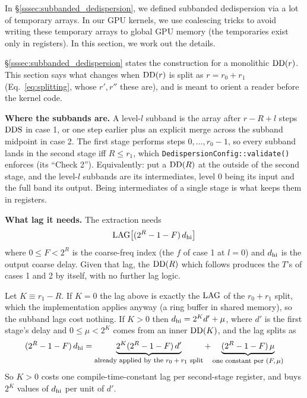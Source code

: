 \documentclass{article}
\numberwithin{equation}{section}   %
\def\DDS{{\rm DDS}}
\def\DD{{\rm DD}}
\def\LAG{{\rm LAG}}
\begin{document}
In \S\ref{sssec:subbanded_dedispersion}, we defined subbanded dedispersion via
a lot of temporary arrays.
In our GPU kernels, we use coalescing tricks to avoid
writing these temporary arrays to global GPU memory (the temporaries exist only in registers).
In this section, we work out the details.

\S\ref{sssec:subbanded_dedispersion} states the construction for a monolithic $\DD(r)$. This
section says what changes when $\DD(r)$ is split as $r = r_0+r_1$ (Eq.\ \ref{eq:splitting},
whose $r',r''$ these are), and is meant to orient a reader before the kernel code.

{\bf Where the subbands are.} A level-$l$ subband is the array after $r-R+l$ steps $\DDS$ in
case 1, or one step earlier plus an explicit merge across the subband midpoint in case 2. The
first stage performs steps $0,\ldots,r_0-1$, so every subband lands in the second stage iff
$R \le r_1$, which {\tt DedispersionConfig::validate()} enforces (its ``Check 2''). Equivalently:
put a $\DD(R)$ at the outside of the second stage, and the level-$l$ subbands are its
intermediates, level $0$ being its input and the full band its output. Being intermediates of a
single stage is what keeps them in registers.

{\bf What lag it needs.} The extraction needs
\begin{equation}
\LAG\big[ (2^R-1-F)\, d_{\rm hi} \big]
\end{equation}
where $0 \le F < 2^R$ is the coarse-freq index (the $f$ of case 1 at $l=0$) and $d_{\rm hi}$ is
the output coarse delay. Given that lag, the $\DD(R)$ which follows produces the $T$'s of cases
1 and 2 by itself, with no further lag logic.

Let $K \equiv r_1 - R$. If $K=0$ the lag above is exactly the $\LAG$ of the $r_0+r_1$ split,
which the implementation applies anyway (a ring buffer in shared memory), so the subband lags
cost nothing. If $K>0$ then $d_{\rm hi} = 2^K d' + \mu$, where $d'$ is the first stage's delay
and $0 \le \mu < 2^K$ comes from an inner $\DD(K)$, and the lag splits as
\begin{equation}
(2^R-1-F)\, d_{\rm hi} = \underbrace{2^K (2^R-1-F)\, d'}_{\mbox{\footnotesize already applied by the $r_0+r_1$ split}}
                        + \underbrace{(2^R-1-F)\, \mu}_{\mbox{\footnotesize one constant per $(F,\mu)$}}
\end{equation}
So $K>0$ costs one compile-time-constant lag per second-stage register, and buys $2^K$ values
of $d_{\rm hi}$ per unit of $d'$.
\end{document}
